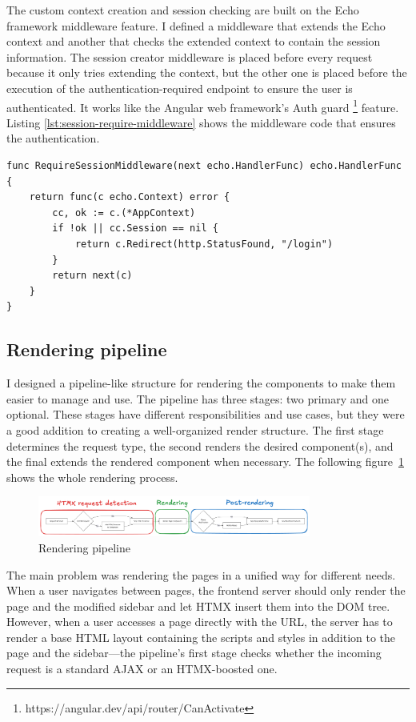 The custom context creation and session checking are built on the Echo framework middleware feature. I defined a middleware that extends the Echo context and another that checks the extended context to contain the session information. The session creator middleware is placed before every request because it only tries extending the context, but the other one is placed before the execution of the authentication-required endpoint to ensure the user is authenticated. It works like the Angular web framework's Auth guard \footnote{https://angular.dev/api/router/CanActivate} feature. Listing \ref{lst:session-require-middleware} shows the middleware code that ensures the authentication.

\begin{lstlisting}[caption=Session checking middleware code,label=lst:session-require-middleware]
func RequireSessionMiddleware(next echo.HandlerFunc) echo.HandlerFunc {
	return func(c echo.Context) error {
		cc, ok := c.(*AppContext)
		if !ok || cc.Session == nil {
			return c.Redirect(http.StatusFound, "/login")
		}
		return next(c)
	}
}
\end{lstlisting}

\subsection{Rendering pipeline}

I designed a pipeline-like structure for rendering the components to make them easier to manage and use. The pipeline has three stages: two primary and one optional. These stages have different responsibilities and use cases, but they were a good addition to creating a well-organized render structure. The first stage determines the request type, the second renders the desired component(s), and the final extends the rendered component when necessary. The following figure~\ref{fig:rendering-pipeline} shows the whole rendering process.

\begin{figure}[H]
    \centering
    \includegraphics[width=0.8\textwidth, keepaspectratio]{figures/rendering-pipeline.png}
    \caption{Rendering pipeline}
    \label{fig:rendering-pipeline}
\end{figure}

The main problem was rendering the pages in a unified way for different needs. When a user navigates between pages, the frontend server should only render the page and the modified sidebar and let HTMX insert them into the DOM tree. However, when a user accesses a page directly with the URL, the server has to render a base HTML layout containing the scripts and styles in addition to the page and the sidebar—the pipeline's first stage checks whether the incoming request is a standard AJAX or an HTMX-boosted one.

